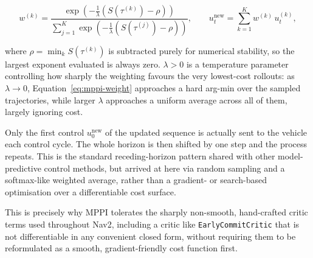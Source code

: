 \begin{equation}
  w^{(k)} = \frac{\exp\!\left(-\frac{1}{\lambda}\left(S(\tau^{(k)}) - \rho\right)\right)}
                 {\sum_{j=1}^{K} \exp\!\left(-\frac{1}{\lambda}\left(S(\tau^{(j)}) - \rho\right)\right)},
  \qquad
  u_t^{\text{new}} = \sum_{k=1}^{K} w^{(k)}\, u_t^{(k)},
  \label{eq:mppi-weight}
\end{equation}

where $\rho = \min_k S(\tau^{(k)})$ is subtracted purely for
numerical stability, so the largest exponent evaluated is always
zero. $\lambda > 0$ is a temperature parameter controlling how
sharply the weighting favours the very lowest-cost rollouts: as
$\lambda \to 0$, Equation~\ref{eq:mppi-weight} approaches a hard
arg-min over the sampled trajectories, while larger $\lambda$
approaches a uniform average across all of them, largely ignoring
cost.

Only the first control $u_0^{\text{new}}$ of the updated sequence is
actually sent to the vehicle each control cycle. The whole horizon
is then shifted by one step and the process repeats. This is the
standard receding-horizon pattern shared with other model-predictive
control methods, but arrived at here via random sampling and a
softmax-like weighted average, rather than a gradient- or search-based
optimisation over a differentiable cost surface.

This is precisely why MPPI tolerates the sharply non-smooth,
hand-crafted critic terms used throughout Nav2, including a critic
like \texttt{EarlyCommitCritic} that is not differentiable in any
convenient closed form, without requiring them to be reformulated as
a smooth, gradient-friendly cost function first.


